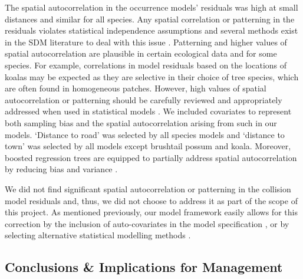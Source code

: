 The spatial autocorrelation in the occurrence models' residuals was high at small distances and similar for all species.  Any spatial correlation or patterning in the residuals violates statistical independence assumptions and several methods exist in the SDM literature to deal with this issue \citep[e.g.][]{augu96,dorm07,dorm13}.  Patterning and higher values of spatial autocorrelation are plausible in certain ecological data and for some species.  For example, correlations in model residuals based on the locations of koalas may be expected as they are selective in their choice of tree species, which are often found in homogeneous patches.  However, high values of spatial autocorrelation or patterning should be carefully reviewed and appropriately addressed when used in statistical models \citep{wint06}.  We included covariates to represent both sampling bias and the spatial autocorrelation arising from such in our models.  `Distance to road' was selected by all species models and `distance to town' was selected by all models except brushtail possum and koala.  Moreover, boosted regression trees are equipped to partially address spatial autocorrelation by reducing bias and variance \citep{elit08}.

We did not find significant spatial autocorrelation or patterning in the collision model residuals and, thus, we did not choose to address it as part of the scope of this project.  As mentioned previously, our model framework easily allows for this correction by the inclusion of auto-covariates in the model specification \citep[e.g.][]{dwye16,farm12,gome08}, or by selecting alternative statistical modelling methods \citep[e.g.][]{zhan05}.

\subsection{Conclusions \& Implications for Management}

